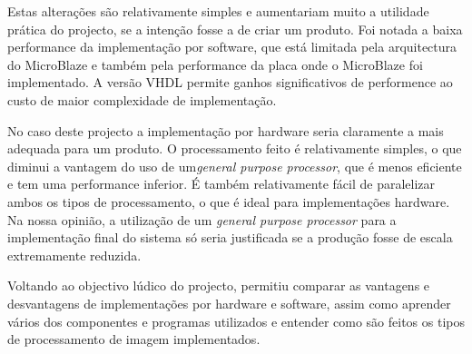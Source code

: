 \documentclass[a4paper,12pt]{article}
\begin{document}
Estas alterações são relativamente simples e aumentariam muito a utilidade prática do projecto, se a intenção fosse a de criar um produto. 
Foi notada a baixa performance da implementação por software, que está limitada pela arquitectura do MicroBlaze e também pela performance da placa onde o MicroBlaze foi implementado. A versão VHDL permite ganhos significativos de performence ao custo de maior complexidade de implementação.   

No caso deste projecto a implementação por hardware seria claramente a mais adequada para um produto. O processamento feito é relativamente simples, o que diminui a vantagem do uso de um\textit{general purpose processor}, que é menos eficiente e tem uma performance inferior. É também relativamente fácil de paralelizar ambos os tipos de processamento, o que é ideal para implementações hardware. Na nossa opinião, a utilização de um \textit{general purpose processor} para a implementação final do sistema só seria justificada se a produção fosse de escala extremamente reduzida.

Voltando ao objectivo lúdico do projecto, permitiu comparar as vantagens e desvantagens de implementações por hardware e software, assim como aprender vários dos componentes e programas utilizados e entender como são feitos os tipos de processamento de imagem implementados. 



\nocite{labsECom}
\end{document}
